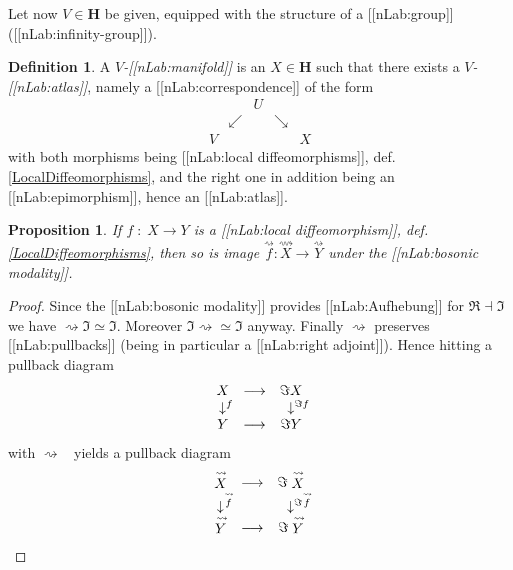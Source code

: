 \documentclass[12pt,titlepage]{article}
\def\mathrlap{\mathpalette\mathrlapinternal}
\def\mathrlapinternal#1#2{\rlap{$\mathsurround=0pt#1{#2}$}}
\newcommand{\itexarray}[1]{\begin{matrix}#1\end{matrix}}
\theoremstyle{plain}
\newtheorem{prop}{Proposition}
\theoremstyle{definition}
\newtheorem{defn}{Definition}
\theoremstyle{remark}
\begin{document}
Let now $V \in \mathbf{H}$ be given, equipped with the structure of a [[nLab:group]] ([[nLab:infinity-group]]).
\begin{defn}
\label{VManifold}\hypertarget{VManifold}{}
A \emph{$V$-[[nLab:manifold]]} is an $X \in \mathbf{H}$ such that there exists a \emph{$V$-[[nLab:atlas]]}, namely a [[nLab:correspondence]] of the form
\begin{displaymath}
\itexarray{
    && U
    \\
    & \swarrow && \searrow
    \\
    V && && X
  }
\end{displaymath}
with both morphisms being [[nLab:local diffeomorphisms]], def. \ref{LocalDiffeomorphisms}, and the right one in addition being an [[nLab:epimorphism]], hence an [[nLab:atlas]].
\end{defn}
\begin{prop}
\label{}\hypertarget{}{}
If $f \;\colon\; X \longrightarrow Y$ is a [[nLab:local diffeomorphism]], def. \ref{LocalDiffeomorphisms}, then so is image $\stackrel{\rightsquigarrow}{f}\colon \stackrel{\rightsquigarrow}{X} \longrightarrow \stackrel{\rightsquigarrow}{Y}$ under the [[nLab:bosonic modality]].
\end{prop}
\begin{proof}
Since the [[nLab:bosonic modality]] provides [[nLab:Aufhebung]] for $\Re\dashv \Im$ we have $\rightsquigarrow \Im \simeq \Im$. Moreover $\Im \rightsquigarrow \simeq \Im$ anyway. Finally $\rightsquigarrow$ preserves [[nLab:pullbacks]] (being in particular a [[nLab:right adjoint]]). Hence hitting a pullback diagram
\begin{displaymath}
\itexarray{
    X &\longrightarrow& \Im X
    \\
    \downarrow^{\mathrlap{f}} && \downarrow^{\mathrlap{\Im f}}
    \\
    Y &\longrightarrow& \Im Y
  }
\end{displaymath}
with $\rightsquigarrow\;\;$ yields a pullback diagram
\begin{displaymath}
\itexarray{
    \stackrel{\rightsquigarrow}{X} &\longrightarrow& \Im \stackrel{\rightsquigarrow}{X}
    \\
    \downarrow^{\mathrlap{\stackrel{\rightsquigarrow}{f}}} && \downarrow^{\mathrlap{\Im \stackrel{\rightsquigarrow}{f}}}
    \\
    \stackrel{\rightsquigarrow}{Y} &\longrightarrow& \Im \stackrel{\rightsquigarrow}{Y}
  }
\end{displaymath}
\end{proof}
\end{document}
